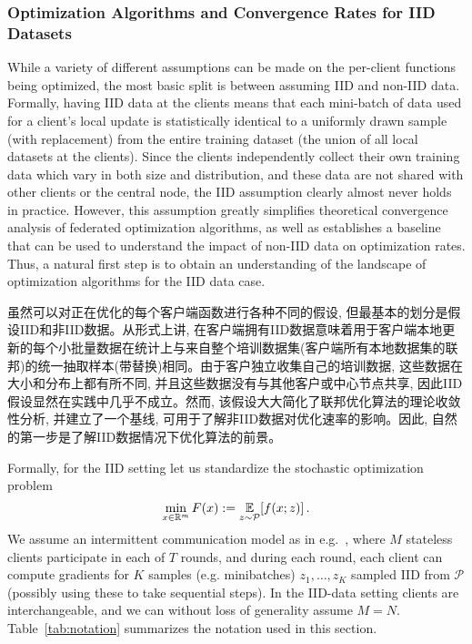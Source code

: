 \subsubsection{Optimization Algorithms and Convergence Rates for IID Datasets}
\label{sec:iid}

While a variety of different assumptions can be made on the per-client functions being optimized, the most basic split is between assuming IID and non-IID data. Formally, having IID data at the clients means that each mini-batch of data used for a client's local update is statistically identical to a uniformly drawn sample (with replacement) from the entire training dataset (the union of all local datasets at the clients). Since the clients independently collect their own training data which vary in both size and distribution, and these data are not shared with other clients or the central node, the IID assumption clearly almost never holds in practice. However, this assumption greatly simplifies theoretical convergence analysis of federated optimization algorithms, as well as establishes a baseline that can be used to understand the impact of non-IID data on optimization rates. Thus, a natural first step is to obtain an understanding of the landscape of optimization algorithms for the IID data case.

虽然可以对正在优化的每个客户端函数进行各种不同的假设, 但最基本的划分是假设IID和非IID数据。从形式上讲, 在客户端拥有IID数据意味着用于客户端本地更新的每个小批量数据在统计上与来自整个培训数据集(客户端所有本地数据集的联邦)的统一抽取样本(带替换)相同。由于客户独立收集自己的培训数据, 这些数据在大小和分布上都有所不同, 并且这些数据没有与其他客户或中心节点共享, 因此IID假设显然在实践中几乎不成立。然而, 该假设大大简化了联邦优化算法的理论收敛性分析, 并建立了一个基线, 可用于了解非IID数据对优化速率的影响。因此, 自然的第一步是了解IID数据情况下优化算法的前景。


\noindent Formally, for the IID setting let us standardize the stochastic optimization problem
\[ 
   \min_{x \in \mathbb{R}^m} F(x) := \operatorname*{\mathbb{E}}_{z \sim \mathcal{P}} [f(x; z)] \,.
\]
We assume an intermittent communication model as in e.g.\ \citet[Sec. 4.4]{woodworth18graphoracle}, where $M$ stateless clients participate in each of $T$ rounds, and during each round, each client can compute gradients for $K$ samples (e.g. minibatches) $z_1, \dots, z_K$ sampled IID from $\mathcal{P}$ (possibly using these to take sequential steps). In the IID-data setting clients are interchangeable, and we can without loss of generality assume $M=N$. Table~\ref{tab:notation} summarizes the notation used in this section.


